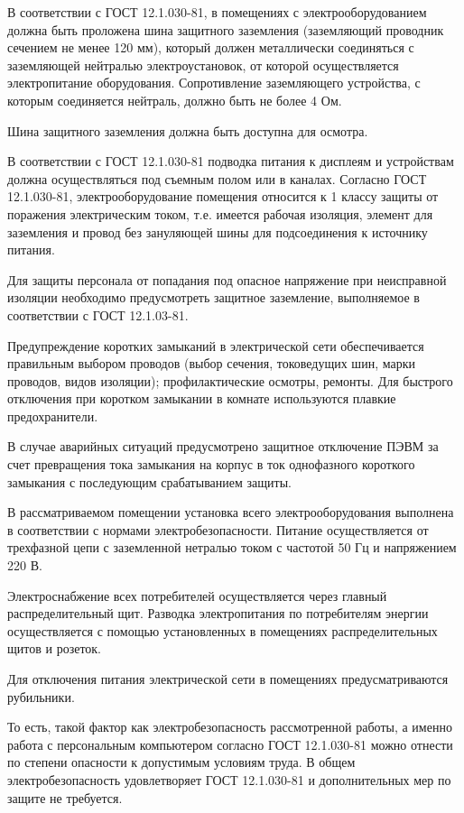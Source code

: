 В соответствии с ГОСТ 12.1.030-81, в помещениях с электрооборудованием должна быть проложена шина защитного заземления (заземляющий проводник сечением не менее 120 мм), который должен металлически соединяться с заземляющей нейтралью электроустановок, от которой осуществляется электропитание оборудования.
Сопротивление заземляющего устройства, с которым соединяется нейтраль, должно быть не более 4 Ом.

Шина защитного заземления должна быть доступна для осмотра.

В соответствии с ГОСТ 12.1.030-81 подводка питания к дисплеям и устройствам должна осуществляться под съемным полом или в каналах.
Согласно ГОСТ 12.1.030-81, электрооборудование помещения относится к 1 классу защиты от поражения электрическим током, т.е. имеется рабочая изоляция, элемент для заземления и провод без зануляющей шины для подсоединения к источнику питания.

Для защиты персонала от попадания под опасное напряжение при неисправной изоляции необходимо предусмотреть защитное заземление, выполняемое в соответствии с ГОСТ 12.1.03-81.

Предупреждение коротких замыканий в электрической сети обеспечивается правильным выбором проводов (выбор сечения, токоведущих шин, марки проводов, видов изоляции); профилактические осмотры, ремонты.
Для быстрого отключения при коротком замыкании в комнате используются плавкие предохранители.

В случае аварийных ситуаций предусмотрено защитное отключение ПЭВМ за счет превращения тока замыкания на корпус в ток однофазного короткого замыкания с последующим срабатыванием защиты.

В рассматриваемом помещении установка всего электрооборудования выполнена в соответствии с нормами электробезопасности.
Питание осуществляется от трехфазной цепи с заземленной нетралью током с частотой 50 Гц и напряжением 220 В.

Электроснабжение всех потребителей осуществляется через главный распределительный щит.
Разводка электропитания по потребителям энергии осуществляется с помощью установленных в помещениях распределительных щитов и розеток.

Для отключения питания электрической сети в помещениях предусматриваются рубильники.

То есть, такой фактор как электробезопасность рассмотренной работы, а именно работа с персональным компьютером согласно ГОСТ 12.1.030-81 можно отнести по степени опасности к допустимым условиям труда.
В общем электробезопасность удовлетворяет ГОСТ 12.1.030-81 и дополнительных мер по защите не требуется.

